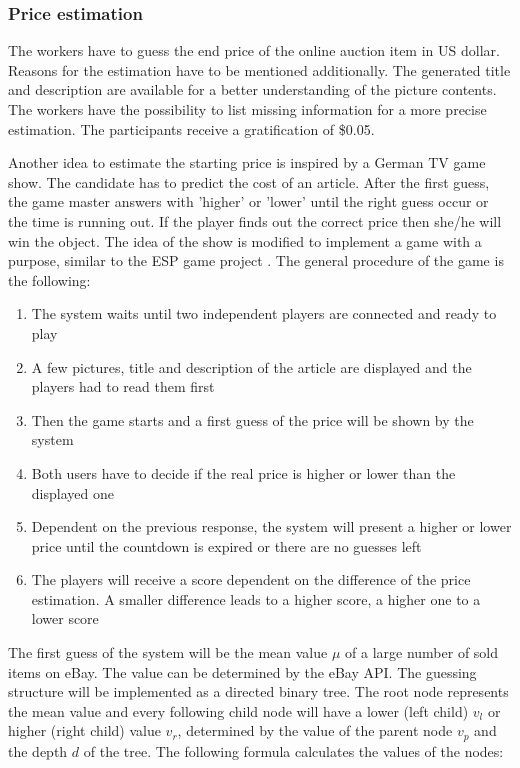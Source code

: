 \subsubsection{Price estimation}
The workers have to guess the end price of the online auction item in US dollar. Reasons for the estimation have to be mentioned additionally. The generated title and description are available for a better understanding of the picture contents. The workers have the possibility to list missing information for a more precise estimation. The participants receive a gratification of \$0.05.

Another idea to estimate the starting price is inspired by a German TV game show. The candidate has to predict the cost of an article. After the first guess, the game master answers with 'higher' or 'lower' until the right guess occur or the time is running out. If the player finds out the correct price then she/he will win the object.  
The idea of the show is modified to implement a game with a purpose, similar to the ESP game project \cite{esp}. The general procedure of the game is the following: 
\begin{enumerate}
	\item The system waits until two independent players are connected and ready to play 
	\item A few pictures, title and description of the article are displayed and the players had to read them first 
	\item Then the game starts and a first guess of the price will be shown by the system 
	\item Both users have to decide if the real price is higher or lower than the displayed one 
	\item Dependent on the previous response, the system will present a higher or lower price until the countdown is expired or there are no guesses left 
	\item The players will receive a score dependent on the difference of the price estimation. A smaller difference leads to a higher score, a higher one to a lower score 
\end{enumerate}
The first guess of the system will be the mean value \( \mu \) of a large number of sold items on eBay. The value can be determined by the eBay API. The guessing structure will be implemented as a directed binary tree. The root node represents the mean value and every following child node will have a lower (left child) \( v_l \) or higher (right child) value  \( v_r \), determined by the value of the parent node  \( v_p \) and the depth  \( d \) of the tree. The following formula calculates the values  of the nodes: 
